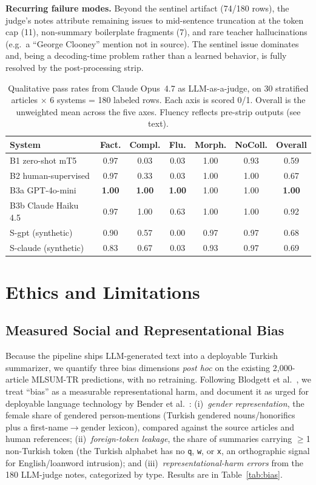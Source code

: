 \documentclass[conference]{IEEEtran}
\begin{document}
\textbf{Recurring failure modes.} Beyond the sentinel artifact (74/180 rows), the judge's notes attribute remaining issues to mid-sentence truncation at the token cap (11), non-summary boilerplate fragments (7), and rare teacher hallucinations (e.g.\ a ``George Clooney'' mention not in source). The sentinel issue dominates and, being a decoding-time problem rather than a learned behavior, is fully resolved by the post-processing strip.

\begin{table}[t]
\centering
\caption{Qualitative pass rates from Claude Opus~4.7 as LLM-as-a-judge, on 30 stratified articles $\times$ 6 systems = 180 labeled rows. Each axis is scored 0/1. Overall is the unweighted mean across the five axes. Fluency reflects pre-strip outputs (see text).}
\label{tab:qual}
\footnotesize
\setlength{\tabcolsep}{4pt}
\begin{tabular}{lcccccc}
\toprule
System & Fact. & Compl. & Flu. & Morph. & NoColl. & Overall \\
\midrule
B1 zero-shot mT5    & 0.97 & 0.03 & 0.03 & 1.00 & 0.93 & 0.59 \\
B2 human-supervised & 0.97 & 0.33 & 0.03 & 1.00 & 1.00 & 0.67 \\
B3a GPT-4o-mini     & \textbf{1.00} & \textbf{1.00} & \textbf{1.00} & 1.00 & 1.00 & \textbf{1.00} \\
B3b Claude Haiku 4.5 & 0.97 & 1.00 & 0.63 & 1.00 & 1.00 & 0.92 \\
S-gpt (synthetic)   & 0.90 & 0.57 & 0.00 & 0.97 & 0.97 & 0.68 \\
S-claude (synthetic) & 0.83 & 0.67 & 0.03 & 0.93 & 0.97 & 0.69 \\
\bottomrule
\end{tabular}
\end{table}

\section{Ethics and Limitations}
\label{sec:ethics}
\subsection{Measured Social and Representational Bias}
Because the pipeline ships LLM-generated text into a deployable Turkish summarizer, we quantify three bias dimensions \emph{post hoc} on the existing 2{,}000-article MLSUM-TR predictions, with no retraining. Following Blodgett et al.~\cite{blodgett2020bias}, we treat ``bias'' as a measurable representational harm, and document it as urged for deployable language technology by Bender et al.~\cite{bender2021parrots}: (i)~\emph{gender representation}, the female share of gendered person-mentions (Turkish gendered nouns/honorifics plus a first-name$\rightarrow$gender lexicon), compared against the source articles and human references; (ii)~\emph{foreign-token leakage}, the share of summaries carrying $\geq$1 non-Turkish token (the Turkish alphabet has no \texttt{q}, \texttt{w}, or \texttt{x}, an orthographic signal for English/loanword intrusion); and (iii)~\emph{representational-harm errors} from the 180 LLM-judge notes, categorized by type. Results are in Table~\ref{tab:bias}.
\end{document}
